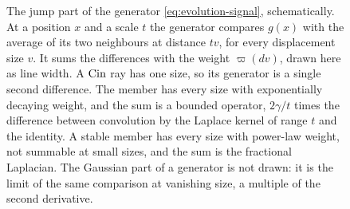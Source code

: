 \begin{figure}[t]
\begin{tikzpicture}[every node/.style={font=\small}, line cap=round, >=stealth]
\end{tikzpicture}
\caption{The jump part of the generator \ref{eq:evolution-signal}, schematically. At a
position $x$ and a scale $t$ the generator compares $g(x)$ with the average of its two
neighbours at distance $tv$, for every displacement size $v$. It sums the differences with the
weight $\varpi(dv)$, drawn here as line width. A $\operatorname{Cin}$ ray has one size, so its generator is a
single second difference. The \Matern{} member has every size with exponentially decaying
weight, and the sum is a bounded operator, $2\gamma/t$ times the difference between
convolution by the Laplace kernel of range $t$ and the identity. A stable member has every
size with power-law weight, not summable at small sizes, and the sum is the fractional
Laplacian. The Gaussian part of a generator is not drawn: it is the limit of the same
comparison at vanishing size, a multiple of the second derivative.}
\label{fig:generator}
\end{figure}
